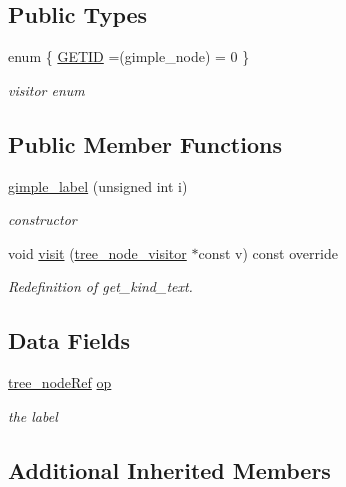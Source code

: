 \subsection*{Public Types}
\begin{DoxyCompactItemize}
\item 
enum \{ \hyperlink{structgimple__label_a4080bc1de9cc7cea049ca5e8293fabc5ac85e61f23f199699b2a955b97e6c1a0f}{G\+E\+T\+ID} =(gimple\+\_\+node) = 0
 \}\begin{DoxyCompactList}\small\item\em visitor enum \end{DoxyCompactList}
\end{DoxyCompactItemize}
\subsection*{Public Member Functions}
\begin{DoxyCompactItemize}
\item 
\hyperlink{structgimple__label_adcef9a662ab704a8d762584fb3ae51e0}{gimple\+\_\+label} (unsigned int i)
\begin{DoxyCompactList}\small\item\em constructor \end{DoxyCompactList}\item 
void \hyperlink{structgimple__label_a7948e2a870e18e9a7c7d8a722a6fa26b}{visit} (\hyperlink{classtree__node__visitor}{tree\+\_\+node\+\_\+visitor} $\ast$const v) const override
\begin{DoxyCompactList}\small\item\em Redefinition of get\+\_\+kind\+\_\+text. \end{DoxyCompactList}\end{DoxyCompactItemize}
\subsection*{Data Fields}
\begin{DoxyCompactItemize}
\item 
\hyperlink{tree__node_8hpp_a6ee377554d1c4871ad66a337eaa67fd5}{tree\+\_\+node\+Ref} \hyperlink{structgimple__label_aa87ea22f7cfff70f4149ff4212b70c69}{op}
\begin{DoxyCompactList}\small\item\em the label \end{DoxyCompactList}\end{DoxyCompactItemize}
\subsection*{Additional Inherited Members}


